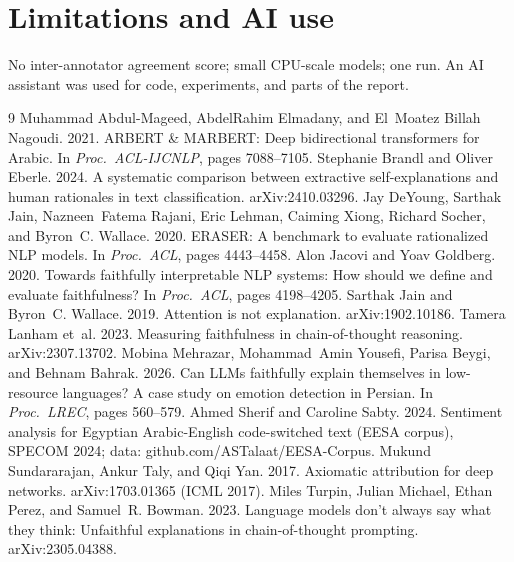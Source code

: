 \documentclass[11pt]{article}
\begin{document}
\section*{Limitations and AI use}
No inter-annotator agreement score; small CPU-scale models;
one run. An AI assistant was used for code, experiments, and parts of the report.


\begingroup\small\setlength{\bibsep}{1pt}
\begin{thebibliography}{9}
Muhammad Abdul-Mageed, AbdelRahim Elmadany, and El~Moatez Billah Nagoudi. 2021.
ARBERT \& MARBERT: Deep bidirectional transformers for Arabic. In \emph{Proc.\ ACL-IJCNLP}, pages 7088--7105.
Stephanie Brandl and Oliver Eberle. 2024. A systematic comparison between extractive self-explanations and human rationales in text classification. arXiv:2410.03296.
Jay DeYoung, Sarthak Jain, Nazneen~Fatema Rajani, Eric Lehman, Caiming Xiong, Richard Socher, and Byron~C. Wallace. 2020. ERASER: A benchmark to evaluate rationalized NLP models. In \emph{Proc.\ ACL}, pages 4443--4458.
Alon Jacovi and Yoav Goldberg. 2020. Towards faithfully interpretable NLP systems: How should we define and evaluate faithfulness? In \emph{Proc.\ ACL}, pages 4198--4205.
Sarthak Jain and Byron~C. Wallace. 2019. Attention is not explanation. arXiv:1902.10186.
Tamera Lanham et~al. 2023. Measuring faithfulness in chain-of-thought reasoning. arXiv:2307.13702.
Mobina Mehrazar, Mohammad~Amin Yousefi, Parisa Beygi, and Behnam Bahrak. 2026. Can LLMs faithfully explain themselves in low-resource languages? A case study on emotion detection in Persian. In \emph{Proc.\ LREC}, pages 560--579.
Ahmed Sherif and Caroline Sabty. 2024. Sentiment analysis for Egyptian Arabic-English code-switched text (EESA corpus), SPECOM 2024; data: github.com/ASTalaat/EESA-Corpus.
Mukund Sundararajan, Ankur Taly, and Qiqi Yan. 2017. Axiomatic attribution for deep networks. arXiv:1703.01365 (ICML 2017).
Miles Turpin, Julian Michael, Ethan Perez, and Samuel~R. Bowman. 2023. Language models don't always say what they think: Unfaithful explanations in chain-of-thought prompting. arXiv:2305.04388.
\end{thebibliography}
\endgroup
\end{document}
